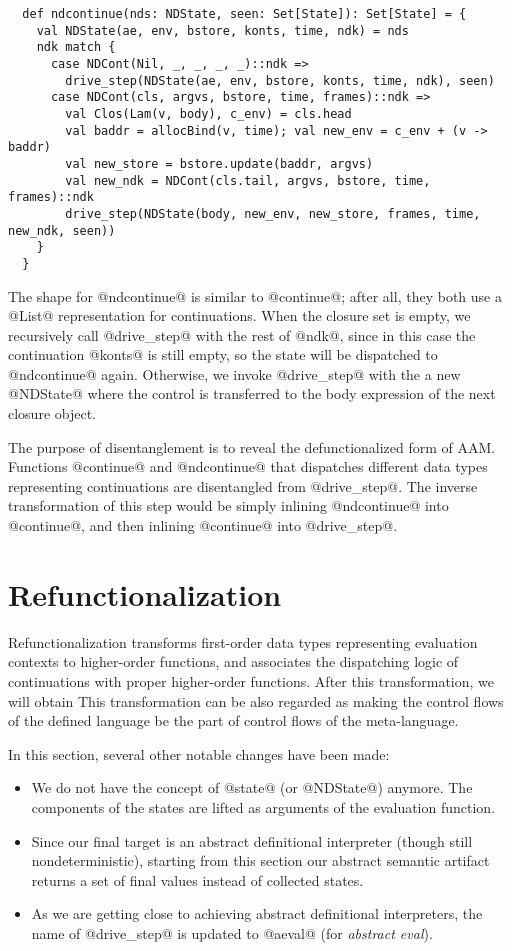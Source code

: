 \documentclass[acmsmall, review]{acmart}\settopmatter{}
\begin{document}
\begin{lstlisting}
  def ndcontinue(nds: NDState, seen: Set[State]): Set[State] = {
    val NDState(ae, env, bstore, konts, time, ndk) = nds
    ndk match {
      case NDCont(Nil, _, _, _, _)::ndk =>
        drive_step(NDState(ae, env, bstore, konts, time, ndk), seen)
      case NDCont(cls, argvs, bstore, time, frames)::ndk =>
        val Clos(Lam(v, body), c_env) = cls.head
        val baddr = allocBind(v, time); val new_env = c_env + (v -> baddr)
        val new_store = bstore.update(baddr, argvs)
        val new_ndk = NDCont(cls.tail, argvs, bstore, time, frames)::ndk
        drive_step(NDState(body, new_env, new_store, frames, time, new_ndk, seen))
    }
  }
\end{lstlisting}

The shape for @ndcontinue@ is similar to @continue@; after all, they both use a 
@List@ representation for continuations. When the closure set is empty, we recursively 
call @drive_step@ with the rest of @ndk@, since in this case the continuation 
@konts@ is still empty, so the state will be dispatched to @ndcontinue@ again.
Otherwise, we invoke @drive_step@ with the a new @NDState@ where the control 
is transferred to the body expression of the next closure object.

The purpose of disentanglement is to reveal the defunctionalized form of AAM.
Functions @continue@ and @ndcontinue@ that dispatches different data types representing 
continuations are disentangled from @drive_step@. 
The inverse transformation of this step would be simply inlining @ndcontinue@ into @continue@,
and then inlining @continue@ into @drive_step@.

\section{Refunctionalization} \label{sec:refunc}

Refunctionalization transforms first-order data types representing evaluation contexts 
to higher-order functions, and associates the dispatching logic of continuations with
proper higher-order functions.
After this transformation, we will obtain 
This transformation can be also regarded as making the control flows of the defined 
language be the part of control flows of the meta-language.

In this section, several other notable changes have been made:
\begin{itemize}
\item We do not have the concept of @state@ (or @NDState@) anymore.
  The components of the states are lifted as arguments of the evaluation function.
\item Since our final target is an abstract definitional interpreter (though still
  nondeterministic), starting from this section our abstract semantic artifact
  returns a set of final values instead of collected states.
\item As we are getting close to achieving abstract definitional interpreters, 
  the name of @drive_step@ is updated to @aeval@ (for \emph{abstract eval}).
\end{itemize}
\end{document}
